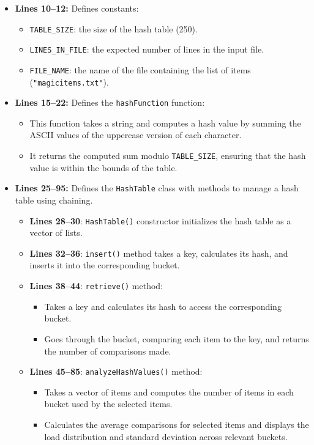 \documentclass{article}
\begin{document}
\begin{itemize}
    \item \textbf{Lines 10--12:} Defines constants:
        \begin{itemize}
            \item \texttt{TABLE\_SIZE}: the size of the hash table (250).
            \item \texttt{LINES\_IN\_FILE}: the expected number of lines in the input file.
            \item \texttt{FILE\_NAME}: the name of the file containing the list of items (\texttt{"magicitems.txt"}).
        \end{itemize}

    \item \textbf{Lines 15--22:} Defines the \texttt{hashFunction} function:
        \begin{itemize}
            \item This function takes a string and computes a hash value by summing the ASCII values of the uppercase version of each character.
            \item It returns the computed sum modulo \texttt{TABLE\_SIZE}, ensuring that the hash value is within the bounds of the table.
        \end{itemize}

    \item \textbf{Lines 25--95:} Defines the \texttt{HashTable} class with methods to manage a hash table using chaining.
        \begin{itemize}
            \item \textbf{Lines 28--30}: \texttt{HashTable()} constructor initializes the hash table as a vector of lists.
            \item \textbf{Lines 32--36}: \texttt{insert()} method takes a key, calculates its hash, and inserts it into the corresponding bucket.
            \item \textbf{Lines 38--44}: \texttt{retrieve()} method:
                \begin{itemize}
                    \item Takes a key and calculates its hash to access the corresponding bucket.
                    \item Goes through the bucket, comparing each item to the key, and returns the number of comparisons made.
                \end{itemize}
            \item \textbf{Lines 45--85}: \texttt{analyzeHashValues()} method:
                \begin{itemize}
                    \item Takes a vector of items and computes the number of items in each bucket used by the selected items.
                    \item Calculates the average comparisons for selected items and displays the load distribution and standard deviation across relevant buckets.
                \end{itemize}
        \end{itemize}


\end{itemize}
\end{document}
